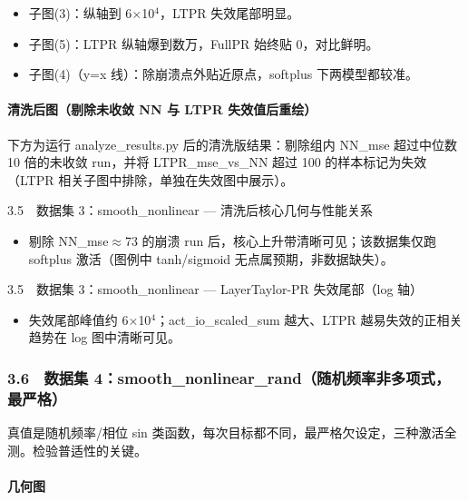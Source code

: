 \documentclass[UTF8,a4paper,11pt]{ctexart}
\begin{document}
\begin{itemize}
\item 子图(3)：纵轴到 6$\times$10$^4$，LTPR 失效尾部明显。
\end{itemize}

\begin{itemize}
\item 子图(5)：LTPR 纵轴爆到数万，FullPR 始终贴 0，对比鲜明。
\end{itemize}

\begin{itemize}
\item 子图(4)（y=x 线）：除崩溃点外贴近原点，softplus 下两模型都较准。
\end{itemize}

\paragraph{清洗后图（剔除未收敛 NN 与 LTPR 失效值后重绘）}

下方为运行 analyze\_results.py 后的清洗版结果：剔除组内 NN\_mse 超过中位数 10 倍的未收敛 run，并将 LTPR\_mse\_vs\_NN 超过 100 的样本标记为失效（LTPR 相关子图中排除，单独在失效图中展示）。

3.5　数据集 3：smooth\_nonlinear --- 清洗后核心几何与性能关系

\begin{itemize}
\item 剔除 NN\_mse$\approx$73 的崩溃 run 后，核心上升带清晰可见；该数据集仅跑 softplus 激活（图例中 tanh/sigmoid 无点属预期，非数据缺失）。
\end{itemize}

3.5　数据集 3：smooth\_nonlinear --- LayerTaylor-PR 失效尾部（log 轴）

\begin{itemize}
\item 失效尾部峰值约 6$\times$10$^4$；act\_io\_scaled\_sum 越大、LTPR 越易失效的正相关趋势在 log 图中清晰可见。
\end{itemize}

\subsubsection{3.6　数据集 4：smooth\_nonlinear\_rand（随机频率非多项式，最严格）}

真值是随机频率/相位 sin 类函数，每次目标都不同，最严格欠设定，三种激活全测。检验普适性的关键。

\paragraph{几何图}
\end{document}
